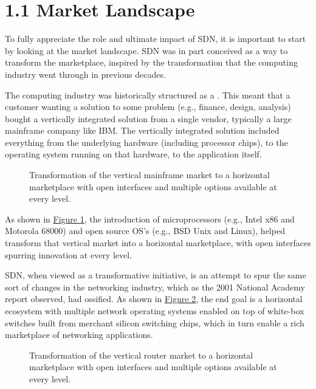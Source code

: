 \documentclass[letterpaper,11pt,english]{sphinxmanual}
\let\sphinxpxdimen\pdfpxdimen\else\newdimen\sphinxpxdimen
\begin{document}
\section{1.1 Market Landscape}
\label{\detokenize{intro:market-landscape}}
To fully appreciate the role and ultimate impact of SDN, it is
important to start by looking at the market landscape. SDN was in part
conceived as a way to transform the marketplace, inspired by the
transformation that the computing industry went through in previous
decades.

The computing industry was historically structured as a . This meant that a customer wanting a solution to some problem
(e.g., finance, design, analysis) bought a vertically integrated
solution from a single vendor, typically a large mainframe company
like IBM. The vertically integrated solution included everything from
the underlying hardware (including processor chips), to the operating
system running on that hardware, to the application itself.

\begin{figure}[htbp]
\centering
\capstart

\noindent\sphinxincludegraphics[width=600\sphinxpxdimen]{{Slide1}.png}
\caption{Transformation of the vertical mainframe market to a horizontal
marketplace with open interfaces and multiple options available at
every level.}\label{\detokenize{intro:id9}}\label{\detokenize{intro:fig-market1}}\end{figure}

As shown in \hyperref[\detokenize{intro:fig-market1}]{Figure \ref{\detokenize{intro:fig-market1}}}, the introduction of
microprocessors (e.g., Intel x86 and Motorola 68000) and open source
OS’s (e.g., BSD Unix and Linux), helped transform that vertical market
into a horizontal marketplace, with open interfaces spurring
innovation at every level.

SDN, when viewed as a transformative initiative, is an attempt to spur
the same sort of changes in the networking industry, which as the 2001
National Academy report observed, had ossified. As shown in
\hyperref[\detokenize{intro:fig-market2}]{Figure \ref{\detokenize{intro:fig-market2}}}, the end goal is a horizontal
ecosystem with multiple network operating systems enabled on top of
white-box switches built from merchant silicon switching chips, which
in turn enable a rich marketplace of networking applications.

\begin{figure}[htbp]
\centering
\capstart

\noindent\sphinxincludegraphics[width=600\sphinxpxdimen]{{Slide2}.png}
\caption{Transformation of the vertical router market to a horizontal
marketplace with open interfaces and multiple options available at
every level.}\label{\detokenize{intro:id10}}\label{\detokenize{intro:fig-market2}}\end{figure}
\end{document}
